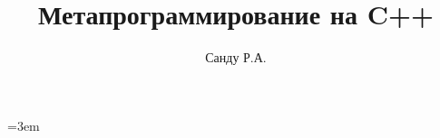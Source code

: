 \documentclass[a5paper, 11pt, openany]{book}
\title{Метапрограммирование на C++}
\author{Санду Р.А.}
\begin{document}
\maketitle
\tableofcontents







\emergencystretch=3em
\printbibliography
\end{document}
